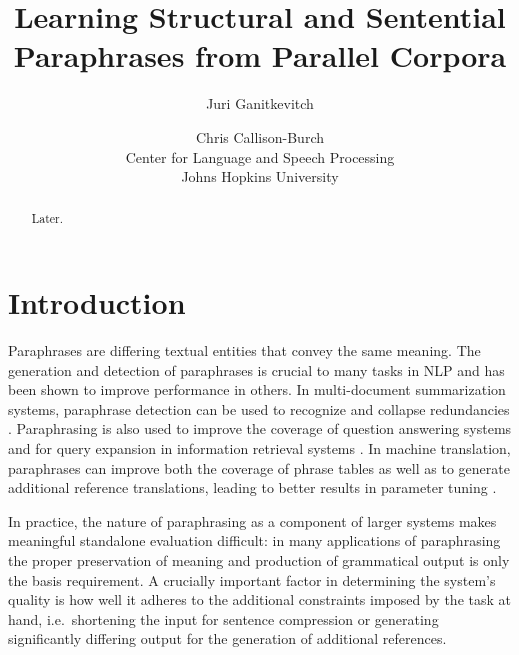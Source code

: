 \documentclass[11pt]{article}
\title{Learning Structural and Sentential Paraphrases from Parallel Corpora}
\author{Juri Ganitkevitch \and Chris Callison-Burch\\ 
Center for Language and Speech Processing\\ 
Johns Hopkins University}
\date{}
\newcommand{\mnote}[1]{\marginpar{%
  \vskip-\baselineskip
  \raggedright\footnotesize
  \itshape\hrule\smallskip\tiny{#1}\par\smallskip\hrule}}
\begin{document}
\maketitle

\begin{abstract}
Later.
\end{abstract}

\section{Introduction} \label{introduction}

Paraphrases are differing textual entities that convey the same
meaning. The generation and detection of paraphrases is crucial to
many tasks in NLP and has been shown to improve performance in
others. In multi-document summarization systems, paraphrase detection
can be used to recognize and collapse redundancies
\cite{Barzilay1999}. Paraphrasing is also used to improve the coverage
of question answering systems \cite{Ravichandran2002} and for query
expansion in information retrieval systems \cite{Anick1999}. In
machine translation, paraphrases can improve both the coverage of
phrase tables \cite{Callison-Burch2006b} as well as to generate
additional reference translations, leading to better results in
parameter tuning \cite{Madnani2007}. 

In practice, the nature of paraphrasing as a component of larger
systems makes meaningful standalone evaluation difficult: \mnote{refer
  to some attempts at eval} in many applications of paraphrasing the
proper preservation of meaning and production of grammatical output is
only the basis requirement. A crucially important factor in
determining the system's quality is how well it adheres to the
additional constraints imposed by the task at hand, i.e.\ shortening
the input for sentence compression or generating significantly
differing output for the generation of additional
references. \cite{Madnani2010b}
\end{document}
